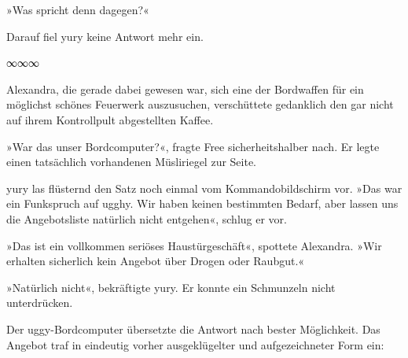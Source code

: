 »Was spricht denn dagegen?«

Darauf fiel yury keine Antwort mehr ein.

\begin{center}
	∞∞∞
\end{center}


Alexandra, die gerade dabei gewesen war, sich eine der Bordwaffen für ein möglichst schönes Feuerwerk auszusuchen, verschüttete gedanklich den gar nicht auf ihrem Kontrollpult abgestellten Kaffee.

»War das unser Bordcomputer?«, fragte Free sicherheitshalber nach. Er legte einen tatsächlich vorhandenen Müsliriegel zur Seite.

yury las flüsternd den Satz noch einmal vom Kommandobildschirm vor. »Das war ein Funkspruch auf ugghy. Wir haben keinen bestimmten Bedarf, aber lassen uns die Angebotsliste natürlich nicht entgehen«, schlug er vor.

»Das ist ein vollkommen seriöses Haustürgeschäft«, spottete Alexandra. »Wir erhalten sicherlich kein Angebot über Drogen oder Raubgut.«

»Natürlich nicht«, bekräftigte yury. Er konnte ein Schmunzeln nicht unterdrücken.

Der uggy-Bordcomputer übersetzte die Antwort nach bester Möglichkeit. Das Angebot traf in eindeutig vorher ausgeklügelter und aufgezeichneter Form ein:

